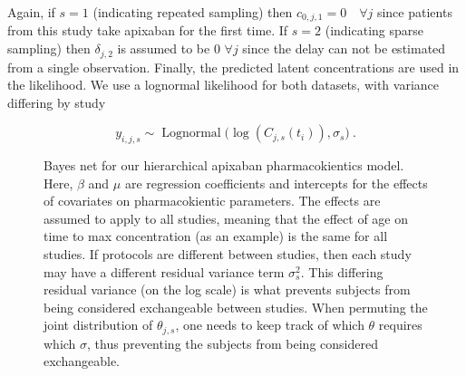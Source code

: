 Again, if $s=1$ (indicating repeated sampling) then $c_{0, j, 1} = 0 \quad \forall j$ since patients from this study take apixaban for the first time.  If $s=2$ (indicating sparse sampling) then $\delta_{j, 2}$ is assumed to be 0 $\forall j$ since the delay can not be estimated from a single observation.  Finally, the predicted latent concentrations are used in the likelihood.  We use a lognormal likelihood for both datasets, with variance differing by study

$$ y_{i,j,s} \sim \operatorname{Lognormal}\Big( \log(C_{j, s}(t_i)), \sigma_s \Big)  \>.$$


\begin{figure}[t!]
	
	\centering
	\caption{Bayes net for our hierarchical apixaban pharmacokientics model.  Here, $\beta$ and $\mu$ are regression coefficients and intercepts for the effects of covariates on pharmacokientic parameters.  The effects are assumed to apply to all studies, meaning that the effect of age on time to max concentration (as an example) is the same for all studies.  If protocols are different between studies, then each study may have a different residual variance term $\sigma^2_s$.  This differing residual variance (on the log scale) is what prevents subjects from being considered exchangeable between studies.  When permuting the joint distribution of $\theta_{j, s}$, one needs to keep track of which $\theta$ requires which $\sigma$, thus preventing the subjects from being considered exchangeable.}
\end{figure}

